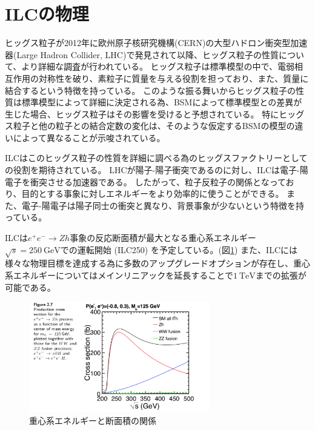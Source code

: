 \section{ILCの物理} \label{Intro:PhysicsofILC}

ヒッグス粒子が2012年に欧州原子核研究機構(CERN)の大型ハドロン衝突型加速器(Large Hadron Collider, LHC)で発見されて以降、ヒッグス粒子の性質について、より詳細な調査が行われている。
ヒッグス粒子は標準模型の中で、電弱相互作用の対称性を破り、素粒子に質量を与える役割を担っており、また、質量に結合するという特徴を持っている。
このような振る舞いからヒッグス粒子の性質は標準模型によって詳細に決定される為、BSMによって標準模型との差異が生じた場合、ヒッグス粒子はその影響を受けると予想されている。
特にヒッグス粒子と他の粒子との結合定数の変化は、そのような仮定するBSMの模型の違いによって異なることが示唆されている。

ILCはこのヒッグス粒子の性質を詳細に調べる為のヒッグスファクトリーとしての役割を期待されている。
LHCが陽子-陽子衝突であるのに対し、ILCは電子-陽電子を衝突させる加速器である。
したがって、粒子反粒子の関係となっており、目的とする事象に対しエネルギーをより効率的に使うことができる。
また、電子-陽電子は陽子同士の衝突と異なり、背景事象が少ないという特徴を持っている。

ILCは$e^+e^- \to Zh$事象の反応断面積が最大となる重心系エネルギー$\sqrt{s}=250\ \mathrm{GeV}$での運転開始 (ILC250) を予定している。(図\ref{4eetoZH})
また、ILCには様々な物理目標を達成する為に多数のアップグレードオプションが存在し、重心系エネルギーについてはメインリニアックを延長することで$1\ \mathrm{TeV}$までの拡張が可能である。

\begin{figure}[htbp]
 \centering
 \includegraphics[width=0.7\textwidth]{Figure/1Introduction/4eetoZH.png}
 \caption{重心系エネルギーと断面積の関係\cite{TechnicalDesignReportPhysics}}
 \label{4eetoZH}
\end{figure}


